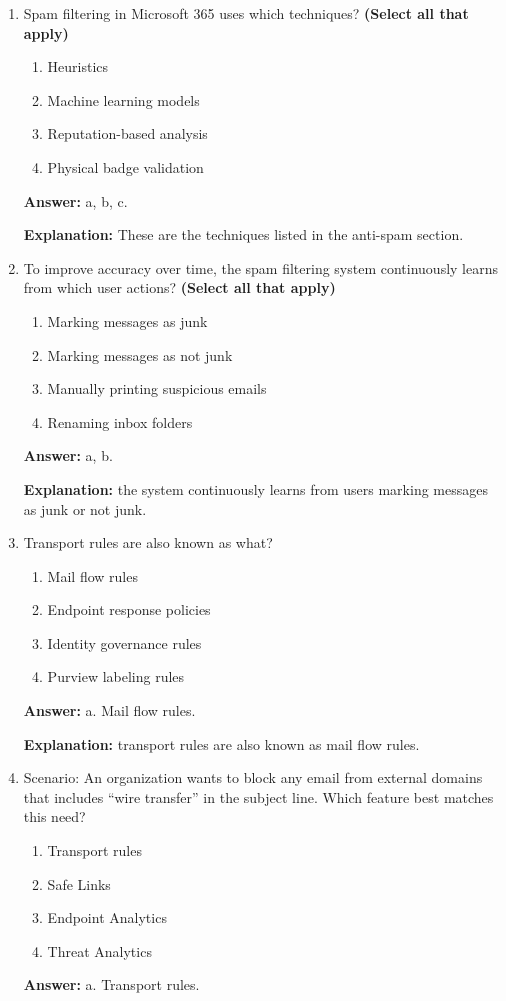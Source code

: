 \documentclass[10pt]{article}
\begin{document}
\begin{enumerate}[leftmargin=*]
\textbf{Explanation:} This is the exact example used to explain common attachment filter policies.

\item Spam filtering in Microsoft 365 uses which techniques? \textbf{(Select all that apply)}
\begin{enumerate}[label=\alph*., leftmargin=1.5em]
\item Heuristics
\item Machine learning models
\item Reputation-based analysis
\item Physical badge validation
\end{enumerate}
\textbf{Answer:} a, b, c.

\textbf{Explanation:} These are the techniques listed in the anti-spam section.

\item To improve accuracy over time, the spam filtering system continuously learns from which user actions? \textbf{(Select all that apply)}
\begin{enumerate}[label=\alph*., leftmargin=1.5em]
\item Marking messages as junk
\item Marking messages as not junk
\item Manually printing suspicious emails
\item Renaming inbox folders
\end{enumerate}
\textbf{Answer:} a, b.

\textbf{Explanation:} the system continuously learns from users marking messages as junk or not junk.

\item Transport rules are also known as what?
\begin{enumerate}[label=\alph*., leftmargin=1.5em]
\item Mail flow rules
\item Endpoint response policies
\item Identity governance rules
\item Purview labeling rules
\end{enumerate}
\textbf{Answer:} a. Mail flow rules.

\textbf{Explanation:} transport rules are also known as mail flow rules.

\item Scenario: An organization wants to block any email from external domains that includes ``wire transfer'' in the subject line. Which feature best matches this need?
\begin{enumerate}[label=\alph*., leftmargin=1.5em]
\item Transport rules
\item Safe Links
\item Endpoint Analytics
\item Threat Analytics
\end{enumerate}
\textbf{Answer:} a. Transport rules.


\end{enumerate}
\end{document}
